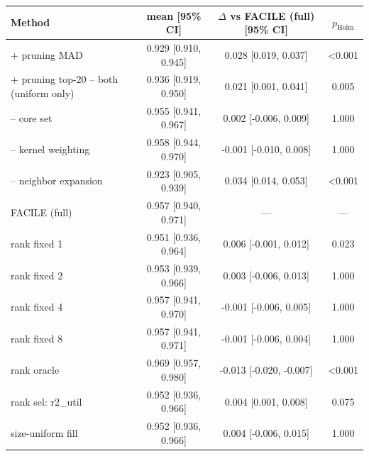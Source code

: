 \begin{tabular}{lccc}
\toprule
Method & mean [95\% CI] & $\Delta$ vs FACILE (full) [95\% CI] & $p_{\mathrm{Holm}}$ \\
\midrule
+ pruning MAD & 0.929 [0.910, 0.945] & 0.028 [0.019, 0.037] & <0.001 \\
+ pruning top-20%
-- both (uniform only) & 0.936 [0.919, 0.950] & 0.021 [0.001, 0.041] & 0.005 \\
-- core set & 0.955 [0.941, 0.967] & 0.002 [-0.006, 0.009] & 1.000 \\
-- kernel weighting & 0.958 [0.944, 0.970] & -0.001 [-0.010, 0.008] & 1.000 \\
-- neighbor expansion & 0.923 [0.905, 0.939] & 0.034 [0.014, 0.053] & <0.001 \\
FACILE (full) & 0.957 [0.940, 0.971] & --- & --- \\
rank fixed 1 & 0.951 [0.936, 0.964] & 0.006 [-0.001, 0.012] & 0.023 \\
rank fixed 2 & 0.953 [0.939, 0.966] & 0.003 [-0.006, 0.013] & 1.000 \\
rank fixed 4 & 0.957 [0.941, 0.970] & -0.001 [-0.006, 0.005] & 1.000 \\
rank fixed 8 & 0.957 [0.941, 0.971] & -0.001 [-0.006, 0.004] & 1.000 \\
rank oracle & 0.969 [0.957, 0.980] & -0.013 [-0.020, -0.007] & <0.001 \\
rank sel: r2_util & 0.952 [0.936, 0.966] & 0.004 [0.001, 0.008] & 0.075 \\
size-uniform fill & 0.952 [0.936, 0.966] & 0.004 [-0.006, 0.015] & 1.000 \\
\bottomrule
\end{tabular}

